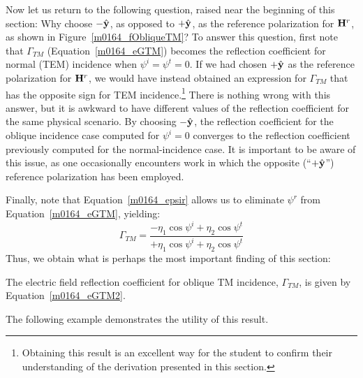 Now let us return to the following question, raised near the beginning of this section:  
Why choose $-\hat{\bf y}$, as opposed to $+\hat{\bf y}$, as the reference polarization for ${\bf H}^r$, as shown in Figure~\ref{m0164_fObliqueTM}?
To answer this question, first note that $\Gamma_{TM}$ (Equation~\ref{m0164_eGTM}) becomes the reflection coefficient for normal (TEM) incidence when $\psi^i=\psi^t=0$.
If we had chosen $+\hat{\bf y}$ as the reference polarization for ${\bf H}^r$, we would have instead obtained an expression for $\Gamma_{TM}$ that has the opposite sign for TEM incidence.\footnote{Obtaining this result is an excellent way for the student to confirm their understanding of the derivation presented in this section.}
There is nothing wrong with this answer, but it is awkward to have different values of the reflection coefficient for the same physical scenario.
By choosing $-\hat{\bf y}$, the reflection coefficient for the oblique incidence case computed for $\psi^i=0$ converges to the reflection coefficient previously computed for the normal-incidence case.
It is important to be aware of this issue, as one occasionally encounters work in which the opposite (``$+\hat{\bf y}$'') reference polarization has been employed.

Finally, note that Equation~\ref{m0164_epsir} allows us to eliminate $\psi^r$ from Equation~\ref{m0164_eGTM}, yielding:
%
\begin{equation}
\boxed{
\Gamma_{TM} = \frac{-\eta_1\cos\psi^i+\eta_2\cos\psi^t}{+\eta_1\cos\psi^i+\eta_2\cos\psi^t}
}
\label{m0164_eGTM2}
\end{equation}
Thus, we obtain what is perhaps the most important finding of this section:
\begin{mdframed}[backgroundcolor=yellow!20,nobreak=true] 
The electric field reflection coefficient for oblique TM incidence, $\Gamma_{TM}$, is given by Equation~\ref{m0164_eGTM2}.
\end{mdframed}
The following example demonstrates the utility of this result.

